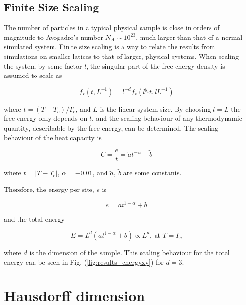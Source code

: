 
\subsection{Finite Size Scaling}
\label{subsec:xyenergyScaling}

The number of particles in a typical physical sample is close in orders of magnitude to Avogadro's number $N_A \sim 10^{23}$, much larger than that of a normal simulated system. Finite size scaling is a way to relate the results from simulations on smaller latices to that of larger, physical systems. When scaling the system by some factor $l$, the singular part of the free-energy density is assumed to scale as \cite{Plischke:EqStatMech}

\begin{equation}
    f_s(t, L^{-1}) = l^{-d} f_s( l^{y_t} t, l L^{-1})
\end{equation}

\noindent where $t = (T - T_c) / T_c$, and $L$ is the linear system size. By choosing $l = L$ the free energy only depends on $t$, and the scaling behaviour of any thermodynamic quantity, describable by the free energy, can be determined. The scaling behaviour of the heat capacity is \cite{Plischke:EqStatMech}

\begin{equation}
    C = \frac{e}{t} = \tilde a t^{-\alpha} + \tilde b
\end{equation}

\noindent where $t = |T - T_c|$, $\alpha = -0.01$, and $\tilde a, \ \tilde b$ are some constants.

Therefore, the energy per site, $e$ is

\begin{equation}
    e = a t^{1 - \alpha} + b
\end{equation}

\noindent and the total energy

\begin{equation}
    E = L^d ( a t^{1 - \alpha} + b ) \propto L^d, \ \text{at $T = T_c$}
\end{equation}

\noindent where $d$ is the dimension of the sample. This scaling behaviour for the total energy can be seen in Fig. (\ref{fig:results_energyxy}) for $d = 3$.

\section{Hausdorff dimension}
\label{sec:hausdorffdimension}

